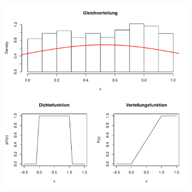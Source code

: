 \begin{figure}[!htbp]
  \centering
  \includegraphics[width=10cm]{images/gleichverteilung.pdf}
\end{figure}

